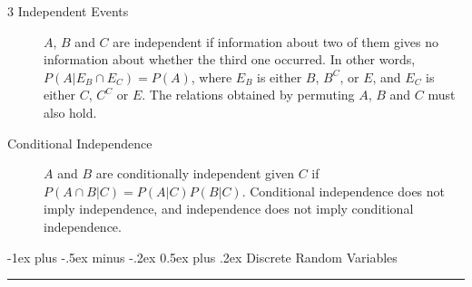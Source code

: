 \documentclass[10pt,landscape]{article}
\makeatletter
\renewcommand{\section}{\@startsection{section}{1}{0mm}%
                                {-1ex plus -.5ex minus -.2ex}%
                                {0.5ex plus .2ex}%
                                {\normalfont\large\bfseries}}
\renewcommand{\subsection}{\@startsection{subsection}{2}{0mm}%
                                {-1explus -.5ex minus -.2ex}%
                                {0.5ex plus .2ex}%
                                {\normalfont\normalsize\bfseries}}
\makeatother
\begin{document}
\begin{multicols*}{3}
\begin{description}
        \item[3 Independent Events] $A$, $B$ and $C$ are independent if information about two of them gives no information about whether the third one occurred.
In other words, $P({ A}|{ E_B\cap E_C}) = P({A})$, where $E_B$ is either $B$, $B^C$, or $E$, and $E_C$ is either $C$, $C^C$ or $E$.
The relations obtained by permuting $A$, $B$ and $C$ must also hold.
        \item[Conditional Independence]  ${A}$ and ${B}$ are conditionally independent given ${C}$ if $P({A}\cap {B}|{C}) = P({A}|{C})P({B}|{C})$. Conditional independence does not imply independence, and independence does not imply conditional independence.
    \end{description}


\section{Discrete Random Variables}\smallskip \hrule height 2pt \smallskip




\end{multicols*}
\end{document}
